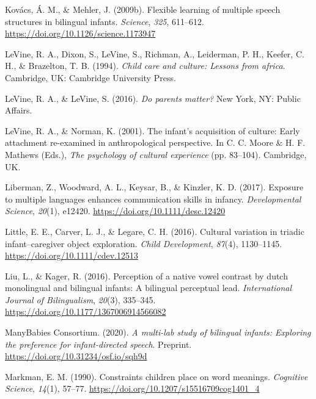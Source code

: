 \documentclass[english,,man,floatsintext]{apa6}
\begin{document}
\leavevmode\hypertarget{ref-Kovacs_Mehler_2009a}{}%
Kovács, Á. M., \& Mehler, J. (2009b). Flexible learning of multiple speech structures in bilingual infants. \emph{Science}, \emph{325}, 611--612. \url{https://doi.org/10.1126/science.1173947}

\leavevmode\hypertarget{ref-LeVine_etal_1994}{}%
LeVine, R. A., Dixon, S., LeVine, S., Richman, A., Leiderman, P. H., Keefer, C. H., \& Brazelton, T. B. (1994). \emph{Child care and culture: Lessons from africa}. Cambridge, UK: Cambridge University Press.

\leavevmode\hypertarget{ref-LeVine_LeVine_2016}{}%
LeVine, R. A., \& LeVine, S. (2016). \emph{Do parents matter?} New York, NY: Public Affairs.

\leavevmode\hypertarget{ref-LeVine_Norman_2001}{}%
LeVine, R. A., \& Norman, K. (2001). The infant's acquisition of culture: Early attachment re-examined in anthropological perspective. In C. C. Moore \& H. F. Mathews (Eds.), \emph{The psychology of cultural experience} (pp. 83--104). Cambridge, UK.

\leavevmode\hypertarget{ref-Liberman_etal_2017}{}%
Liberman, Z., Woodward, A. L., Keysar, B., \& Kinzler, K. D. (2017). Exposure to multiple languages enhances communication skills in infancy. \emph{Developmental Science}, \emph{20}(1), e12420. \url{https://doi.org/10.1111/desc.12420}

\leavevmode\hypertarget{ref-Little_etal_2016}{}%
Little, E. E., Carver, L. J., \& Legare, C. H. (2016). Cultural variation in triadic infant--caregiver object exploration. \emph{Child Development}, \emph{87}(4), 1130--1145. \url{https://doi.org/10.1111/cdev.12513}

\leavevmode\hypertarget{ref-Liu_Kager_2016}{}%
Liu, L., \& Kager, R. (2016). Perception of a native vowel contrast by dutch monolingual and bilingual infants: A bilingual perceptual lead. \emph{International Journal of Bilingualism}, \emph{20}(3), 335--345. \url{https://doi.org/10.1177/1367006914566082}

\leavevmode\hypertarget{ref-ManyBabiesConsortium_2020}{}%
ManyBabies Consortium. (2020). \emph{A multi-lab study of bilingual infants: Exploring the preference for infant-directed speech}. Preprint. \url{https://doi.org/10.31234/osf.io/sqh9d}

\leavevmode\hypertarget{ref-Markman_1990}{}%
Markman, E. M. (1990). Constraints children place on word meanings. \emph{Cognitive Science}, \emph{14}(1), 57--77. \url{https://doi.org/10.1207/s15516709cog1401_4}
\end{document}
